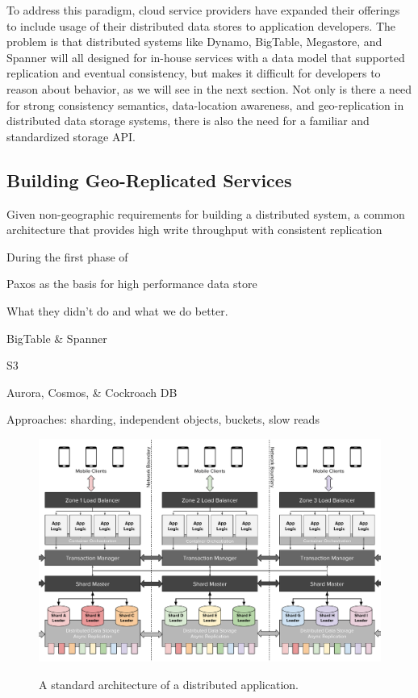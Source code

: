 To address this paradigm, cloud service providers have expanded their offerings to include usage of their distributed data stores to application developers.
The problem is that distributed systems like Dynamo, BigTable, Megastore, and Spanner will all designed for in-house services with a data model that supported replication and eventual consistency, but makes it difficult for developers to reason about behavior, as we will see in the next section.
Not only is there a need for strong consistency semantics, data-location awareness, and geo-replication in distributed data storage systems, there is also the need for a familiar and standardized storage API.


\subsection{Building Geo-Replicated Services}

Given non-geographic requirements for building a distributed system, a common architecture that provides high write throughput with consistent replication

During the first phase of

Paxos as the basis for high performance data store \cite{bolosky_paxos_2011}

What they didn't do and what we do better.

BigTable \& Spanner

S3

Aurora, Cosmos, \& Cockroach DB

Approaches: sharding, independent objects, buckets, slow reads

\begin{figure}
    \begin{center}
        \includegraphics[width=5in]{figures/ch02_distributed_architecture.pdf}
    \end{center}
    \renewcommand{\baselinestretch}{1}
    \small\normalsize

    \begin{quote}
        \caption[Distributed Architectures]{A standard architecture of a distributed application.}
        \label{fig:ch02_distributed_architecture}
    \end{quote}
\end{figure}
\renewcommand{\baselinestretch}{2}
\small\normalsize



